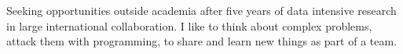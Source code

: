 

\begin{cvparagraph}

Seeking opportunities outside academia after five years of data intensive research in large international collaboration. 
I like to think about complex problems, attack them with programming, to share and learn new things as part of a team.


\end{cvparagraph}
